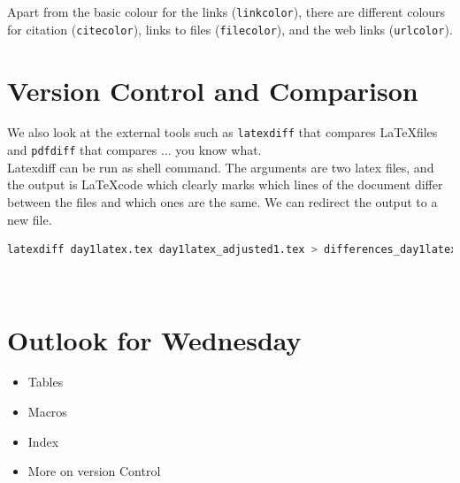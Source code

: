 \documentclass[a4paper,10pt]{report} %
\begin{document}
 Apart from the basic colour for the links (\texttt{linkcolor}), there are different colours for citation (\texttt{citecolor}), links to files (\texttt{filecolor}), and the web links (\texttt{urlcolor}).
 \pagebreak
 
 \section{Version Control and Comparison}
 We also look at the external tools such as \texttt{latexdiff} that compares \LaTeX files and  \texttt{pdfdiff} that compares \( \ldots \) you know what.\\
 
 Latexdiff can be run as shell command. The arguments are two latex files, and the output is \LaTeX code which clearly marks which lines of the document differ between the files and which ones are the same. We can redirect the output to a new file.
 
 \begin{lstlisting}[language={bash}, frame=single,basicstyle=\footnotesize]
  latexdiff day1latex.tex day1latex_adjusted1.tex > differences_day1latex.tex
\end{lstlisting}~\vspace{1ex}
  



\section{Outlook for Wednesday}\label{sec:wednesday}

\begin{itemize}
 \item Tables
 \item Macros
 \item Index
 \item More on version Control
\end{itemize}


 
\label{LastPage}
\newpage
\end{document}
